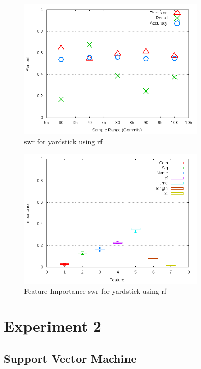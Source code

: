 \begin{figure}[!t]
\centering
\includegraphics[width=0.8\textwidth]{images/rf/test_1/yardstick_sample_range.png}
\caption{\gls{swr} for yardstick using \gls{rf}}
\label{fig:test_1_yardstick_rf}
\end{figure}

\begin{figure}[!t]
\centering
\includegraphics[width=0.8\textwidth]{images/rf/test_1/yardstick_importance.png}
\caption{Feature Importance \gls{swr} for yardstick using \gls{rf}}
\label{fig:test_1_yardstick_rf_importance}
\end{figure}


\section{Experiment 2}
\label{app_sec:experiment_2}

\subsection{Support Vector Machine}
\label{app_sub:experiment_2_svm}
\clearpage

